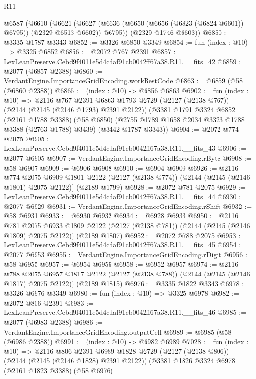 \begin{lexlean}{R11}
\begin{coremodule}
  @6587
    (@6610
      (@6621 (@6627 (@6636 (@6650 (@6656 (@6823 (@6824 @6601)) @6795)) (@2329 @6513 @6602)) @6795))
      (@2329 @1746 @6603))
@6850 := @3335 @1787 @3343
@6852 := @3326 @6850 @3349
@6854 := fun (index : @10) => @3325 @6852
@6856 := @2072 @767 @2391
@6857 := LexLeanPreserve.Cebd9f4011e5d4cdaf91cb0042ff67a38.R11.__fits_42
@6859 := @2077 (@6857 @2388)
@6860 := VerdantEngine.ImportanceGridEncoding.workBestCode
@6863 := @6859 (@58 (@6860 @2388))
@6865 := (index : @10) -> @6856 @6863
@6902 := fun (index : @10) =>
  @2116
    @767
    @2391
    @6863
    @1793
    @2729
    (@2127 (@2138 @767))
    (@2144 (@2145 (@2146 @1793) @2391 @2122))
    (@3381
      @1791
      @3324
      @6852
      (@2161 @1788 @3388)
      (@58 @6850)
      (@2755 @1789 @1658 @2034 @3323 @1788 @3388 (@2763 @1788) @3439)
      (@3442 @1787 @3343))
@6904 := @2072 @774 @2075
@6905 := LexLeanPreserve.Cebd9f4011e5d4cdaf91cb0042ff67a38.R11.__fits_43
@6906 := @2077 @6905
@6907 := VerdantEngine.ImportanceGridEncoding.rByte
@6908 := @58 @6907
@6909 := @6906 @6908
@6910 := @6904 @6909
@6926 := @2116
    @774
    @2075
    @6909
    @1801
    @2122
    (@2127 (@2138 @774))
    (@2144 (@2145 (@2146 @1801) @2075 @2122))
    (@2189 @1799)
@6928 := @2072 @781 @2075
@6929 := LexLeanPreserve.Cebd9f4011e5d4cdaf91cb0042ff67a38.R11.__fits_44
@6930 := @2077 @6929
@6931 := VerdantEngine.ImportanceGridEncoding.rShift
@6932 := @58 @6931
@6933 := @6930 @6932
@6934 := @6928 @6933
@6950 := @2116
    @781
    @2075
    @6933
    @1809
    @2122
    (@2127 (@2138 @781))
    (@2144 (@2145 (@2146 @1809) @2075 @2122))
    (@2189 @1807)
@6952 := @2072 @788 @2075
@6953 := LexLeanPreserve.Cebd9f4011e5d4cdaf91cb0042ff67a38.R11.__fits_45
@6954 := @2077 @6953
@6955 := VerdantEngine.ImportanceGridEncoding.rDigit
@6956 := @58 @6955
@6957 := @6954 @6956
@6958 := @6952 @6957
@6974 := @2116
    @788
    @2075
    @6957
    @1817
    @2122
    (@2127 (@2138 @788))
    (@2144 (@2145 (@2146 @1817) @2075 @2122))
    (@2189 @1815)
@6976 := @3335 @1822 @3343
@6978 := @3326 @6976 @3349
@6980 := fun (index : @10) => @3325 @6978
@6982 := @2072 @806 @2391
@6983 := LexLeanPreserve.Cebd9f4011e5d4cdaf91cb0042ff67a38.R11.__fits_46
@6985 := @2077 (@6983 @2388)
@6986 := VerdantEngine.ImportanceGridEncoding.outputCell
@6989 := @6985 (@58 (@6986 @2388))
@6991 := (index : @10) -> @6982 @6989
@7028 := fun (index : @10) =>
  @2116
    @806
    @2391
    @6989
    @1828
    @2729
    (@2127 (@2138 @806))
    (@2144 (@2145 (@2146 @1828) @2391 @2122))
    (@3381
      @1826
      @3324
      @6978
      (@2161 @1823 @3388)
      (@58 @6976)

\end{coremodule}
\end{lexlean}
